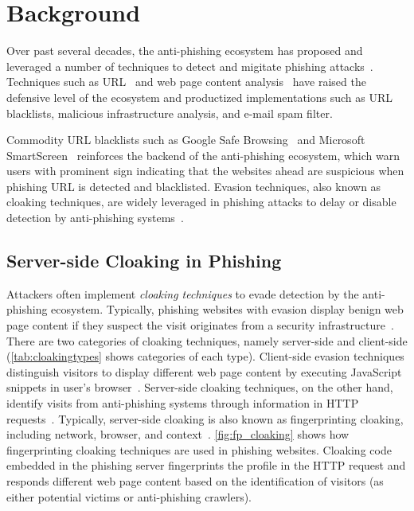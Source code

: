 \section{Background}

\cloakingTypes



Over past several decades, the anti-phishing ecosystem has proposed and leveraged a number of techniques to detect and migitate phishing attacks~\cite{oest2018inside}.
Techniques such as URL~\cite{bin2010dns, blum2010lexical, huang2012svm, khonji2011novel} and web page content analysis~\cite{wu2006web, zhang2007cantina, zhang2011textual, bilge2011exposure, canali2013role} have raised the defensive level of the ecosystem and productized implementations such as URL blacklists, malicious infrastructure analysis, and e-mail spam filter.

Commodity URL blacklists such as Google Safe Browsing~\cite{whittaker2010large} and Microsoft SmartScreen~\cite{smartscreen} reinforces the backend of the anti-phishing ecosystem, which warn users with prominent sign indicating that the websites ahead are suspicious when phishing URL is detected and blacklisted.
Evasion techniques, also known as cloaking techniques, are widely leveraged in phishing attacks to delay or disable detection by anti-phishing systems~\cite{liang2016cracking, oest2019phishfarm, oest20phishtime}.

\subsection{Server-side Cloaking in Phishing}


Attackers often implement \emph{cloaking techniques} to evade detection by the anti-phishing ecosystem.
Typically, phishing websites with evasion display benign web page content if they suspect the visit originates from a security infrastructure~\cite{wu2005cloaking}.
There are two categories of cloaking techniques, namely server-side and client-side (\autoref{tab:cloakingtypes} shows categories of each type).
Client-side evasion techniques distinguish visitors to display different web page content by executing JavaScript snippets in user's browser~\cite{zhang2021crawlphish}.
Server-side cloaking techniques, on the other hand, identify visits from anti-phishing systems through information in HTTP requests~\cite{oest2018inside, invernizzi2016cloak}.
Typically, server-side cloaking is also known as fingerprinting cloaking, including network, browser, and context~\cite{invernizzi2016cloak}.
\autoref{fig:fp_cloaking} shows how fingerprinting cloaking techniques are used in phishing websites.
Cloaking code embedded in the phishing server fingerprints the profile in the HTTP request and responds different web page content based on the identification of visitors (as either potential victims or anti-phishing crawlers).

